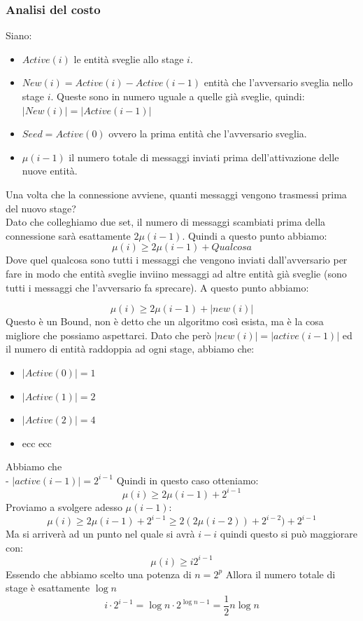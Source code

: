 \subsubsection{Analisi del costo}
  Siano:
  \begin{itemize}
      \item $Active(i)$ le entità sveglie allo stage $i$.
      \item $New(i) = Active(i) - Active(i-1)$  entità che l'avversario sveglia nello stage $i$. Queste sono in numero uguale a quelle già sveglie, quindi: $|New(i)|=|Active(i-1)|$ 
      \item $Seed = Active(0)$ ovvero la prima entità che l'avversario sveglia.
      \item $\mu(i-1)$ il numero totale di messaggi inviati prima dell'attivazione delle nuove entità.%
  \end{itemize}
   Una volta che la connessione avviene, quanti messaggi vengono trasmessi prima del nuovo stage?\\
  Dato che colleghiamo due set, il numero di messaggi scambiati prima della connessione sarà esattamente $2\mu(i-1)$. Quindi a questo punto abbiamo:
   $$\mu(i) \geq 2\mu(i-1) + Qualcosa$$
   Dove quel qualcosa sono tutti i messaggi che vengono inviati dall'avversario per fare in modo che entità sveglie inviino messaggi ad altre entità già sveglie (sono tutti i messaggi che l'avversario fa sprecare). A questo punto abbiamo:
 
  $$\mu(i) \geq 2\mu(i-1) + |new(i)|$$
Questo è un Bound, non è detto che un algoritmo così esista, ma è la cosa migliore che possiamo aspettarci. Dato che però $|new(i)|=|active(i-1)|$ ed il numero di entità raddoppia ad ogni stage, abbiamo che:
\begin{itemize}
    \item $|Active(0)| = 1$
    \item $|Active(1)| = 2$
    \item $|Active(2)| = 4$
    \item ecc ecc
\end{itemize}
Abbiamo che \\
- $|active(i-1)| = 2^{i-1}$ Quindi in questo caso otteniamo:
 $$\mu(i) \geq 2\mu(i-1)+2^{i-1}$$
 Proviamo a svolgere adesso $\mu(i-1)$:
 $$\mu(i) \geq 2\mu(i-1)+2^{i-1} \geq 2(2\mu(i-2))+2^{i-2})+2^{i-1}$$
 Ma si arriverà ad un punto nel quale si avrà $i-i$ quindi questo si può maggiorare con:
  $$\mu(i) \geq i2^{i-1}$$
  Essendo che abbiamo scelto una potenza di $n=2^p$ Allora il numero totale di stage è esattamente $\log n$
  $$i \cdot 2^{i-1} = \log n \cdot 2^{\log n-1} = {\frac{1}{2}} n \log n$$
 
